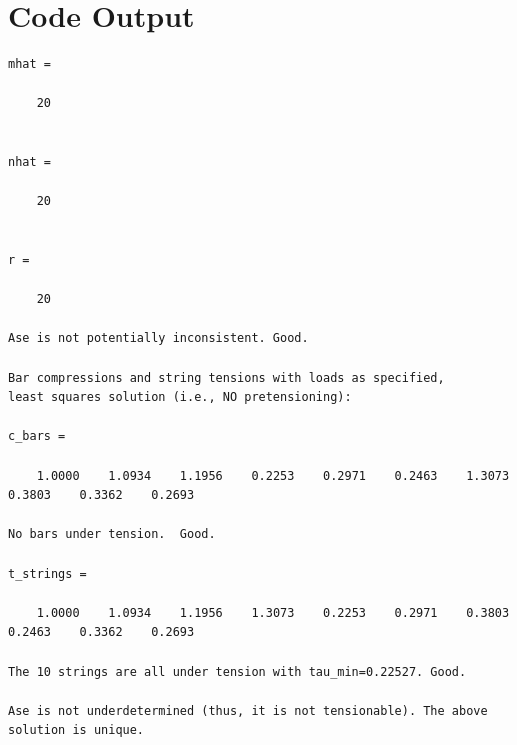 \documentclass{article}
\begin{document}
\section{Code Output}

\begin{lstlisting}[caption={Ouput of MitchellTruss4.m},captionpos=t, label={lst:p1}]
mhat =

    20


nhat =

    20


r =

    20

Ase is not potentially inconsistent. Good.
 
Bar compressions and string tensions with loads as specified,
least squares solution (i.e., NO pretensioning):

c_bars =

    1.0000    1.0934    1.1956    0.2253    0.2971    0.2463    1.3073    0.3803    0.3362    0.2693

No bars under tension.  Good.

t_strings =

    1.0000    1.0934    1.1956    1.3073    0.2253    0.2971    0.3803    0.2463    0.3362    0.2693

The 10 strings are all under tension with tau_min=0.22527. Good.
 
Ase is not underdetermined (thus, it is not tensionable). The above solution is unique.
\end{lstlisting}
\end{document}
